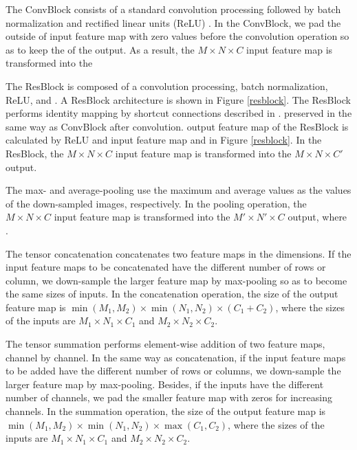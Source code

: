 The ConvBlock consists of a standard convolution processing  followed by batch normalization \cite{ioffe_batch_2015} and rectified linear units (ReLU) \cite{nair_rectified_2010}. In the ConvBlock, we pad the outside of  input feature map with zero values before the convolution operation so as to keep the  of the output. 
As a result, the $M \times N \times C$ input feature map is transformed into the 

The ResBlock is composed of a convolution processing, batch normalization, ReLU, and . A ResBlock architecture is shown in Figure \ref{resblock}.
The ResBlock performs identity mapping by shortcut connections  described in \cite{he_deep_2016}.
 preserved in the same way as ConvBlock after convolution.
 output feature map of the ResBlock is calculated by  ReLU  and  input feature map and  in Figure \ref{resblock}.
In the ResBlock, the $M \times N \times C$ input feature map is transformed into the $M\times N\times C'$ output.

The max- and average-pooling use the maximum and average values as the values of the down-sampled images, respectively.
In the pooling operation, the $M \times N \times C$ input feature map is transformed into the $M' \times N' \times C$ output, where .

The tensor concatenation concatenates two feature maps in the  dimensions.
If the input feature maps to be concatenated have the different number of rows or column, we down-sample the larger feature map by max-pooling so as to become the same sizes of inputs.
In the concatenation operation, the size of the output feature map is $\min (M_1, M_2) \times \min (N_1, N_2) \times (C_1 + C_2)$, where the sizes of the inputs are $M_1 \times N_1 \times C_1$ and $M_2 \times N_2 \times C_2$.

The tensor summation performs element-wise addition of two feature maps, channel by channel. 
In the same way as concatenation, if the input feature maps to be added have the different number of rows or columns, we down-sample the larger feature map by max-pooling.
Besides, if the inputs have the different number of channels, we pad the smaller feature map with zeros for increasing channels.
In the summation operation, the size of the output feature map is $\min (M_1, M_2) \times \min (N_1, N_2) \times \max (C_1, C_2)$, where the sizes of the inputs are $M_1 \times N_1 \times C_1$ and $M_2 \times N_2 \times C_2$.

